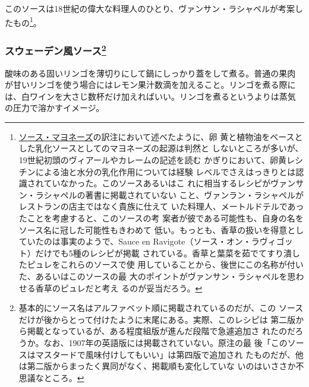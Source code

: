 \begin{recette}
このソースは18世紀の偉大な料理人のひとり、ヴァンサン・ラシャペルが考案したもの\footnote{\protect\hyperlink{mayonnaise}{ソース・マヨネーズ}の訳注において述べたように、卵
  黄と植物油をベースとした乳化ソースとしてのマヨネーズの起源は判然と
  しないところが多いが、19世紀初頭のヴィアールやカレームの記述を読む
  かぎりにおいて、卵黄レシチンによる油と水分の乳化作用については経験
  レベルでさえはっきりとは認識されていなかった。このソースあるいはこ
  れに相当するレシピがヴァンサン・ラシャペルの著書に掲載されていない
  こと、ヴァンラン・ラシャペルがレストランの店主ではなく貴族に仕えて
  いた料理人、メートルドテルであったことを考慮すると、このソースの考
  案者が彼である可能性も、自身の名をソース名に冠した可能性もきわめて
  低い。もっとも、香草の扱いを得意としていたのは事実のようで、Sauce en
  Ravigote（ソース・オン・ラヴィゴット）だけでも5種のレシピが掲載
  されている。香草と葉菜を茹でてすり潰したピュレをこれらのソースで使
  用していることから、後世にこの名称が付いた、あるいはこのソースの最
  大のポイントがヴァンサン・ラシャペルを思わせる香草のピュレだと考え
  るのが妥当だろう。}。

\hypertarget{sauce-suedoise}{%
\subsubsection[スウェーデン風ソース]{\texorpdfstring{スウェーデン風ソース\footnote{基本的にソース名はアルファベット順に掲載されているのだが、この
  ソースだけが後からとって付けたように末尾にある。実際、このレシピは
  第二版から掲載となっているが、ある程度組版が進んだ段階で急遽追加さ
  れたのだろうか。なお、1907年の英語版には掲載されていない。原注の最
  後「このソースはマスタードで風味付けしてもいい」は第四版で追加され
  たものだが、他は第二版からまったく異同がなく、掲載順も変化していな
  いのはいささか不思議なところ。}}{スウェーデン風ソース}}\label{sauce-suedoise}}



酸味のある固いリンゴを薄切りにして鍋にしっかり蓋をして煮る。普通の果肉
が甘いリンゴを使う場合にはレモン果汁数滴を加えること。リンゴを煮る際に
は、白ワインを大さじ数杯だけ加えればいい。リンゴを煮るというよりは蒸気
の圧力で溶かすイメージ。


\end{recette}
